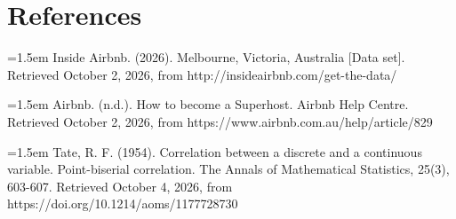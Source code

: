 \documentclass[final,1p,11pt]{elsarticle}
\renewcommand\_{\textunderscore\allowbreak}%
\begin{document}
\clearpage
\section*{References}
\begingroup\setlength{\parindent}{0pt}\setlength{\parskip}{3pt}
\hangindent=1.5em Inside Airbnb. (2026). Melbourne, Victoria, Australia [Data set]. Retrieved October 2, 2026, from http://insideairbnb.com/get-the-data/

\hangindent=1.5em Airbnb. (n.d.). How to become a Superhost. Airbnb Help Centre. Retrieved October 2, 2026, from https://www.airbnb.com.au/help/article/829

\hangindent=1.5em Tate, R. F. (1954). Correlation between a discrete and a continuous variable. Point-biserial correlation. The Annals of Mathematical Statistics, 25(3), 603-607. Retrieved October 4, 2026, from https://doi.org/10.1214/aoms/1177728730
\endgroup
\end{document}
